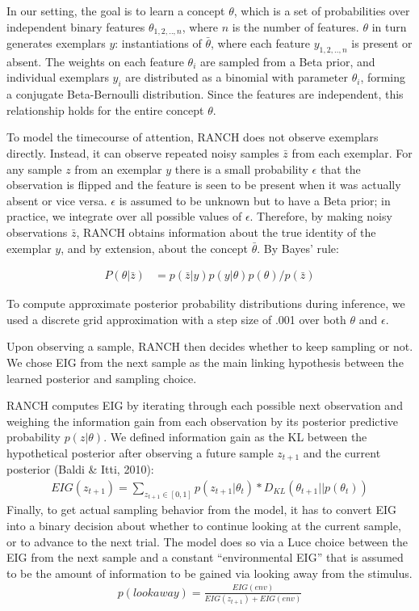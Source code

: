 \documentclass[10pt, letterpaper]{article}
\begin{document}
In our setting, the goal is to learn a concept \(\theta\), which is a
set of probabilities over independent binary features
\(\theta_{1,2,..,n}\), where \(n\) is the number of features. \(\theta\)
in turn generates exemplars \(y\): instantiations of \(\bar{\theta}\),
where each feature \(y_{1,2,..,n}\) is present or absent. The weights on
each feature \(\theta_i\) are sampled from a Beta prior, and individual
exemplars \(y_i\) are distributed as a binomial with parameter
\(\theta_i\), forming a conjugate Beta-Bernoulli distribution. Since the
features are independent, this relationship holds for the entire concept
\(\theta\).

To model the timecourse of attention, RANCH does not observe exemplars
directly. Instead, it can observe repeated noisy samples \(\bar{z}\)
from each exemplar. For any sample \(z\) from an exemplar \(y\) there is
a small probability \(\epsilon\) that the observation is flipped and the
feature is seen to be present when it was actually absent or vice versa.
\(\epsilon\) is assumed to be unknown but to have a Beta prior; in
practice, we integrate over all possible values of \(\epsilon\).
Therefore, by making noisy observations \(\bar{z}\), RANCH obtains
information about the true identity of the exemplar \(y\), and by
extension, about the concept \(\bar{\theta}\). By Bayes' rule:

\begin{eqnarray}
P(\theta|\bar{z}) &= p(\bar{z}|y) p(y|\theta) p(\theta) / p(\bar{z})
\end{eqnarray}

To compute approximate posterior probability distributions during
inference, we used a discrete grid approximation with a step size of
.001 over both \(\theta\) and \(\epsilon\).

Upon observing a sample, RANCH then decides whether to keep sampling or
not. We chose EIG from the next sample as the main linking hypothesis
between the learned posterior and sampling choice.

RANCH computes EIG by iterating through each possible next observation
and weighing the information gain from each observation by its posterior
predictive probability \(p(z|\theta)\). We defined information gain as
the KL between the hypothetical posterior after observing a future
sample \(z_{t+1}\) and the current posterior (Baldi \& Itti, 2010):
\begin{eqnarray}
EIG(z_{t+1}) = \sum_{z_{t+1} \in [0,1]} p(z_{t+1}|\theta_t) * D_{KL}(\theta_{t+1} || p(\theta_t))
\end{eqnarray} Finally, to get actual sampling behavior from the model,
it has to convert EIG into a binary decision about whether to continue
looking at the current sample, or to advance to the next trial. The
model does so via a Luce choice between the EIG from the next sample and
a constant ``environmental EIG'' that is assumed to be the amount of
information to be gained via looking away from the stimulus.
\begin{eqnarray}
p(look away) = \frac{EIG(env)}{EIG(z_{t+1})+EIG(env)}
\end{eqnarray}
\end{document}
